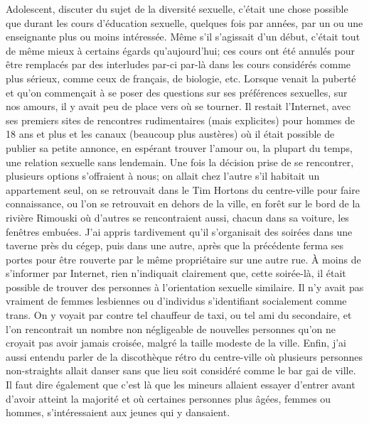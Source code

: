 Adolescent, discuter du sujet de la diversité sexuelle, c'était une chose possible que durant les cours d'éducation sexuelle, quelques fois par années, par un ou une enseignante plus ou moins intéressée.
Même s'il s'agissait d'un début, c'était tout de même mieux à certains égards qu'aujourd'hui; ces cours ont été annulés pour être remplacés par des interludes par-ci par-là dans les cours considérés comme plus sérieux, comme ceux de français, de biologie, etc.
Lorsque venait la puberté et qu'on commençait à se poser des questions sur ses préférences sexuelles, sur nos amours, il y avait peu de place vers où se tourner.
Il restait l'Internet, avec ses premiers sites de rencontres rudimentaires (mais explicites) pour hommes de 18 ans et plus et les canaux \irc{} (beaucoup plus austères) où il était possible de publier sa petite annonce, en espérant trouver l'amour ou, la plupart du temps, une relation sexuelle sans lendemain.
Une fois la décision prise de se rencontrer, plusieurs options s'offraient à nous; on allait chez l'autre s'il habitait un appartement seul, on se retrouvait dans le Tim Hortons du centre-ville pour faire connaissance, ou l'on se retrouvait en dehors de la ville, en forêt sur le bord de la rivière Rimouski où d'autres se rencontraient aussi, chacun dans sa voiture, les fenêtres embuées.
J'ai appris tardivement qu'il s'organisait des soirées dans une taverne près du cégep, puis dans une autre, après que la précédente ferma ses portes pour être rouverte par le même propriétaire sur une autre rue.
À moins de s'informer par Internet, rien n'indiquait clairement que, cette soirée-là, il était possible de trouver des personnes à l'orientation sexuelle similaire.
Il n'y avait pas vraiment de femmes lesbiennes ou d'individus s'identifiant socialement comme trans.
On y voyait par contre tel chauffeur de taxi, ou tel ami du secondaire, et l'on rencontrait un nombre non négligeable de nouvelles personnes qu'on ne croyait pas avoir jamais croisée, malgré la taille modeste de la ville.
Enfin, j'ai aussi entendu parler de la discothèque rétro du centre-ville où plusieurs personnes non-straights allait danser sans que lieu soit considéré comme le bar gai de ville.
Il faut dire également que c'est là que les mineurs allaient essayer d'entrer avant d'avoir atteint la majorité et où certaines personnes plus âgées, femmes ou hommes, s'intéressaient aux jeunes qui y dansaient.

